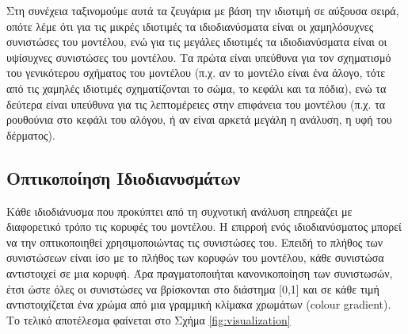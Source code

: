 \documentclass[draft]{article}
\begin{document}
Στη συνέχεια ταξινομούμε αυτά τα ζευγάρια με βάση την ιδιοτιμή σε αύξουσα σειρά,
οπότε λέμε ότι για τις μικρές ιδιοτιμές τα ιδιοδιανύσματα είναι οι χαμηλόσυχνες
συνιστώσες του μοντέλου,
ενώ για τις μεγάλες ιδιοτιμές τα ιδιοδιανύσματα είναι οι υψίσυχνες συνιστώσες του μοντέλου.
Τα πρώτα είναι υπεύθυνα για τον σχηματισμό του γενικότερου σχήματος του μοντέλου
(π.χ. αν το μοντέλο είναι ένα άλογο, τότε από τις χαμηλές ιδιοτιμές σχηματίζονται το
σώμα, το κεφάλι και τα πόδια), ενώ τα δεύτερα είναι υπεύθυνα για τις λεπτομέρειες στην
επιφάνεια του μοντέλου (π.χ. τα ρουθούνια στο κεφάλι του αλόγου,
ή αν είναι αρκετά μεγάλη η ανάλυση, η υφή του δέρματος).

\subsection{Οπτικοποίηση Ιδιοδιανυσμάτων}
Κάθε ιδιοδιάνυσμα που προκύπτει από τη συχνοτική ανάλυση επηρεάζει με διαφορετικό τρόπο
τις κορυφές του μοντέλου. Η επιρροή ενός ιδιοδιανύσματος μπορεί να την οπτικοποιηθεί
χρησιμοποιώντας τις συνιστώσες του. Επειδή το πλήθος των συνιστώσεων είναι ίσο με το
πλήθος των κορυφών του μοντέλου, κάθε συνιστώσα αντιστοιχεί σε μια κορυφή.
Άρα πραγματοποιήται κανονικοποίηση των συνιστωσών, έτσι ώστε όλες οι συνιστώσες να
βρίσκονται στο διάστημα [0,1] και σε κάθε τιμή αντιστοιχίζεται ένα χρώμα
από μια γραμμική κλίμακα χρωμάτων (colour gradient). Το τελικό αποτέλεσμα φαίνεται στο
Σχήμα \ref{fig:visualization}
\end{document}
